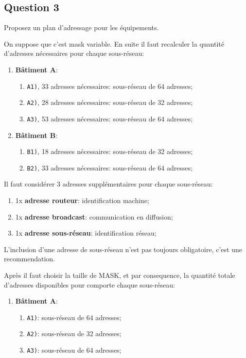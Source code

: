 \documentclass{article}
\begin{document}
\subsection*{Question 3}
\begin{exercise}
    Proposez un plan d'adressage pour les équipements.
\end{exercise}
\begin{resolution}
    On suppose que c'est mask variable. En suite il faut recalculer la quantité d'adresses nécessaires pour chaque sous-réseau:
    \begin{enumerate}
        \item \textbf{Bâtiment A}:
        \begin{enumerate}[noitemsep]
            \item \texttt{A1)}, 33 adresses nécessaires: sous-réseau de 64 adresses;
            \item \texttt{A2)}, 28 adresses nécessaires: sous-réseau de 32 adresses;
            \item \texttt{A3)}, 53 adresses nécessaires: sous-réseau de 64 adresses;
        \end{enumerate}
        
        \item \textbf{Bâtiment B}:
        \begin{enumerate}[noitemsep]
            \item \texttt{B1)}, 18 adresses nécessaires: sous-réseau de 32 adresses;
            \item \texttt{B2)}, 33 adresses nécessaires: sous-réseau de 64 adresses;
        \end{enumerate}
    \end{enumerate}
    Il faut considérer 3 adresses supplémentaires pour chaque sous-réseau:
    \begin{enumerate}[noitemsep]
        \item 1x \textbf{adresse routeur}: identification machine;
        \item 1x \textbf{adresse broadcast}: communication en diffusion;
        \item 1x \textbf{adresse sous-réseau}: identification réseau;
    \end{enumerate}
    \begin{remark}
        L'inclusion d'une adresse de sous-réseau n'est pas toujours obligatoire, c'est une recommendation.
    \end{remark}
    Après il faut choisir la taille de MASK, et par consequence, la quantité totale d'adresses disponibles pour comporte chaque sous-réseau:
    \begin{enumerate}
        \item \textbf{Bâtiment A}:
        \begin{enumerate}[noitemsep]
            \item \texttt{A1)}: sous-réseau de 64 adresses;
            \item \texttt{A2)}: sous-réseau de 32 adresses;
            \item \texttt{A3)}: sous-réseau de 64 adresses;
        \end{enumerate}
        

\end{enumerate}
\end{resolution}
\end{document}
